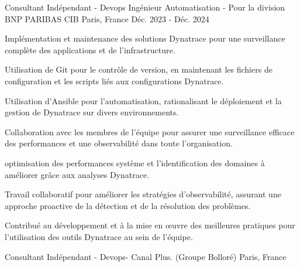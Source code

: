 

\begin{cventries}

  \cventry
    {Consultant Indépendant - Devops  Ingénieur Automatisation - }  %
    {Pour la division BNP PARIBAS CIB} %
    {Paris, France} %
    {Déc. 2023 - Déc. 2024} %
    {
      \begin{cvitems} %
        \item {Implémentation et maintenance des solutions Dynatrace pour une surveillance complète des applications et de l'infrastructure.}
        \item {Utilisation de Git pour le contrôle de version, en maintenant les fichiers de configuration et les scripts liés aux configurations Dynatrace.}
        \item {Utilisation d'Ansible pour l'automatisation, rationalisant le déploiement et la gestion de Dynatrace sur divers environnements.}
        \item {Collaboration avec les membres de l'équipe pour assurer une surveillance efficace des performances et une observabilité dans toute l'organisation.}
        \item {optimisation des performances système et l'identification des domaines à améliorer grâce aux analyses Dynatrace.}
                \item {Travail collaboratif pour améliorer les stratégies d'observabilité, assurant une approche proactive de la détection et de la résolution des problèmes.}
                \item {Contribué au développement et à la mise en œuvre des meilleures pratiques pour l'utilisation des outils Dynatrace au sein de l'équipe.}
              \end{cvitems}
            } %
          \cventry
            {Consultant Indépendant - Devops- } %
            {Canal Plus. (Groupe Bolloré)} %
            {Paris, France} %

\end{cventries}
